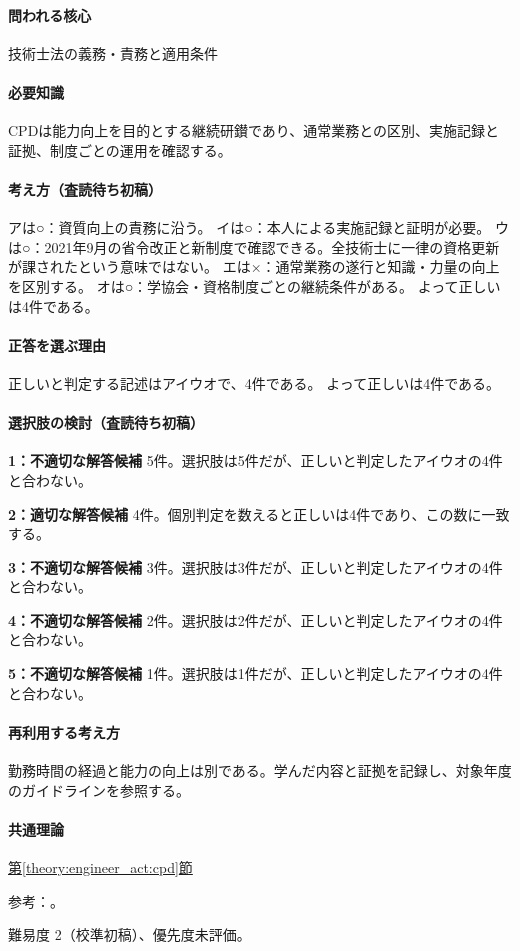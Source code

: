\paragraph{問われる核心} 技術士法の義務・責務と適用条件

\paragraph{必要知識} CPDは能力向上を目的とする継続研鑚であり、通常業務との区別、実施記録と証拠、制度ごとの運用を確認する。

\paragraph{考え方（査読待ち初稿）} アは○：資質向上の責務に沿う。 イは○：本人による実施記録と証明が必要。 ウは○：2021年9月の省令改正と新制度で確認できる。全技術士に一律の資格更新が課されたという意味ではない。 エは×：通常業務の遂行と知識・力量の向上を区別する。 オは○：学協会・資格制度ごとの継続条件がある。 よって正しいは4件である。

\paragraph{正答を選ぶ理由} 正しいと判定する記述はアイウオで、4件である。  よって正しいは4件である。

\paragraph{選択肢の検討（査読待ち初稿）}\mbox{}\par

\noindent\textbf{1：不適切な解答候補} 5件。選択肢は5件だが、正しいと判定したアイウオの4件と合わない。\par

\noindent\textbf{2：適切な解答候補} 4件。個別判定を数えると正しいは4件であり、この数に一致する。\par

\noindent\textbf{3：不適切な解答候補} 3件。選択肢は3件だが、正しいと判定したアイウオの4件と合わない。\par

\noindent\textbf{4：不適切な解答候補} 2件。選択肢は2件だが、正しいと判定したアイウオの4件と合わない。\par

\noindent\textbf{5：不適切な解答候補} 1件。選択肢は1件だが、正しいと判定したアイウオの4件と合わない。\par

\paragraph{再利用する考え方} 勤務時間の経過と能力の向上は別である。学んだ内容と証拠を記録し、対象年度のガイドラインを参照する。

\paragraph{共通理論} \hyperref[theory:engineer_act:cpd]{第\ref*{theory:engineer_act:cpd}節}

\par 参考：\cite{cpd_new2021,cpd_v3}。

\par 難易度 2（校準初稿）、優先度未評価。
